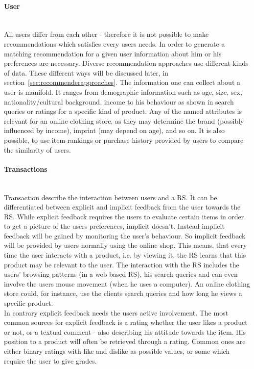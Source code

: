 \paragraph{User}\hfill\\
All users differ from each other - therefore it is not possible to make recommendations which satisfies every users needs.
In order to generate a matching recommendation for a given user information about him or his preferences are necessary.
Diverse recommendation approaches use different kinds of data.
These different ways will be discussed later, in section~\ref{sec:recommenderapproaches}.
The information one can collect about a user is manifold.
It ranges from demographic information such as age, size, sex, nationality/cultural background, income to his behaviour as shown in search queries or ratings for a specific kind of product.
Any of the named attributes is relevant for an online clothing store, as they may determine the brand (possibly influenced by income), imprint (may depend on age), and so on.\citep[p.8-9]{ricci:2011}
It is also possible, to use item-rankings or purchase history provided by users to compare the similarity of users.\citep[p.~377-378]{pradel:2011}

\paragraph{Transactions}\hfill\\
\label{sec:feedback}
Transaction describe the interaction between users and a RS.\citep[p.~9]{ricci:2011}
It can be differentiated between explicit and implicit feedback from the user towards the RS.
While explicit feedback requires the users to evaluate certain items in order to get a picture of the users preferences, implicit doesn't.
Instead implicit feedback will be gained by monitoring the user's behaviour.\citep[p.~76-77]{lops:2011}
So implicit feedback will be provided by users normally using the online shop.
This means, that every time the user interacts with a product, i.e. by viewing it, the RS learns that this product may be relevant to the user.\citep{taghipour:2007}
The interaction with the RS includes the users' browsing patterns (in a web based RS), his search queries and can even involve the users mouse movement (when he uses a computer).\citep[p.~146]{koren:2011}
An online clothing store could, for instance, use the clients search queries and how long he views a specific product.
\\
In contrary explicit feedback needs the users active involvement.
The most common sources for explicit feedback is a rating whether the user likes a product or not, or a textual comment - also describing his attitude towards the item.
His position to a product will often be retrieved through a rating.
Common ones are either binary ratings with like and dislike as possible values, or some which require the user to give grades.\citep[p.~77]{lops:2011}

